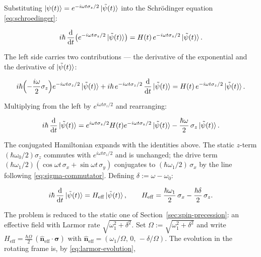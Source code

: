 Substituting $\ket{\psi(t)} = e^{-i\omega t\sigma_z/2}\ket{\tilde\psi(t)}$ into the Schr\"odinger equation \eqref{eq:schroedinger}:
\begin{linenomath}
    \begin{equation*}
        i\hbar\,\frac{\mathrm{d}}{\mathrm{d} t}\bigl(e^{-i\omega t\sigma_z/2}\ket{\tilde\psi(t)}\bigr)
        = H(t)\,e^{-i\omega t\sigma_z/2}\ket{\tilde\psi(t)} .
    \end{equation*}
\end{linenomath}
The left side carries two contributions --- the derivative of the exponential and the derivative of $\ket{\tilde\psi(t)}$:
\begin{linenomath}
    \begin{equation*}
        i\hbar\Bigl(-\frac{i\omega}{2}\sigma_z\Bigr)e^{-i\omega t\sigma_z/2}\ket{\tilde\psi(t)}
        + i\hbar\,e^{-i\omega t\sigma_z/2}\,\frac{\mathrm{d}}{\mathrm{d} t}\ket{\tilde\psi(t)}
        = H(t)\,e^{-i\omega t\sigma_z/2}\ket{\tilde\psi(t)} .
    \end{equation*}
\end{linenomath}
Multiplying from the left by $e^{i\omega t\sigma_z/2}$ and rearranging:
\begin{linenomath}
    \begin{equation*}
        i\hbar\,\frac{\mathrm{d}}{\mathrm{d} t}\ket{\tilde\psi(t)}
        = e^{i\omega t\sigma_z/2}H(t)e^{-i\omega t\sigma_z/2}\ket{\tilde\psi(t)}
          - \frac{\hbar\omega}{2}\,\sigma_z\ket{\tilde\psi(t)} .
    \end{equation*}
\end{linenomath}
The conjugated Hamiltonian expands with the identities above. The static $z$-term $(\hbar\omega_0/2)\sigma_z$ commutes with $e^{i\omega t\sigma_z/2}$ and is unchanged; the drive term $(\hbar\omega_1/2)(\cos\omega t\,\sigma_x + \sin\omega t\,\sigma_y)$ conjugates to $(\hbar\omega_1/2)\,\sigma_x$ by the line following \eqref{eq:sigma-commutator}. Defining $\delta := \omega - \omega_0$:
\begin{linenomath}
    \begin{equation*}
        i\hbar\,\frac{\mathrm{d}}{\mathrm{d} t}\ket{\tilde\psi(t)} = H_{\mathrm{eff}}\ket{\tilde\psi(t)}, \qquad H_{\mathrm{eff}} = \frac{\hbar\omega_1}{2}\,\sigma_x - \frac{\hbar\delta}{2}\,\sigma_z .
    \end{equation*}
\end{linenomath}
The problem is reduced to the static one of Section~\ref{sec:spin-precession}: an effective field with Larmor rate $\sqrt{\omega_1^2 + \delta^2}$. Set $\Omega := \sqrt{\omega_1^2 + \delta^2}$ and write $H_{\mathrm{eff}} = \frac{\hbar\Omega}{2}\,(\hat{\bm n}_{\mathrm{eff}}\!\cdot\!\bm\sigma)$ with $\hat{\bm n}_{\mathrm{eff}} = (\omega_1/\Omega,\,0,\,-\delta/\Omega)$. The evolution in the rotating frame is, by \eqref{eq:larmor-evolution},
